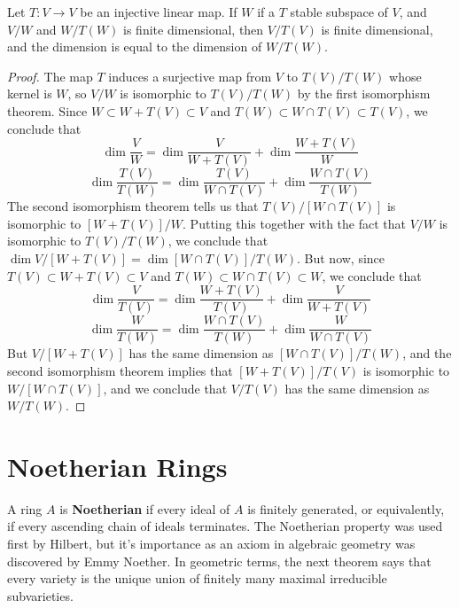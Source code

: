 \begin{theorem}
    Let $T:V \to V$ be an injective linear map. If $W$ if a $T$ stable subspace of $V$, and $V/W$ and $W/T(W)$ is finite dimensional, then $V/T(V)$ is finite dimensional, and the dimension is equal to the dimension of $W/T(W)$.
\end{theorem}
\begin{proof}
    The map $T$ induces a surjective map from $V$ to $T(V)/T(W)$ whose kernel is $W$, so $V/W$ is isomorphic to $T(V)/T(W)$ by the first isomorphism theorem. Since $W \subset W + T(V) \subset V$ and $T(W) \subset W \cap T(V) \subset T(V)$, we conclude that
    \[ \dim \frac{V}{W} = \dim \frac{V}{W + T(V)} + \dim \frac{W + T(V)}{W} \]
    \[ \dim \frac{T(V)}{T(W)} = \dim \frac{T(V)}{W \cap T(V)} + \dim \frac{W \cap T(V)}{T(W)} \]
    The second isomorphism theorem tells us that $T(V)/[W \cap T(V)]$ is isomorphic to $[W + T(V)]/W$. Putting this together with the fact that $V/W$ is isomorphic to $T(V)/T(W)$, we conclude that $\dim V/[W + T(V)] = \dim [W \cap T(V)]/T(W)$. But now, since $T(V) \subset W + T(V) \subset V$ and $T(W) \subset W \cap T(V) \subset W$, we conclude that
    \[ \dim \frac{V}{T(V)} = \dim \frac{W + T(V)}{T(V)} + \dim \frac{V}{W + T(V)} \]
    \[ \dim \frac{W}{T(W)} = \dim \frac{W \cap T(V)}{T(W)} + \dim \frac{W}{W \cap T(V)} \]
    But $V/[W + T(V)]$ has the same dimension as $[W \cap T(V)]/T(W)$, and the second isomorphism theorem implies that $[W + T(V)]/T(V)$ is isomorphic to $W/[W \cap T(V)]$, and we conclude that $V/T(V)$ has the same dimension as $W/T(W)$.
\end{proof}




\chapter{Noetherian Rings}

A ring $A$ is {\bf Noetherian} if every ideal of $A$ is finitely generated, or equivalently, if every ascending chain of ideals terminates. The Noetherian property was used first by Hilbert, but it's importance as an axiom in algebraic geometry was discovered by Emmy Noether. In geometric terms, the next theorem says that every variety is the unique union of finitely many maximal irreducible subvarieties.

